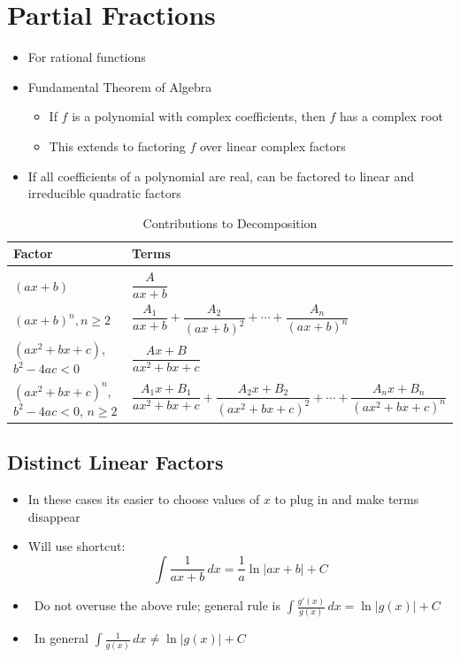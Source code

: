 \documentclass[letterpaper, 11pt, openany]{book}
\theoremstyle{mytheoremstyle}
\theoremstyle{myexamplestyle}
\begin{document}
\section{Partial Fractions}
\setcounter{figure}{0}
\begin{itemize}
    \item For rational functions
    \item Fundamental Theorem of Algebra
    \begin{itemize}
        \item If $f$ is a polynomial with complex coefficients, then $f$ has a complex root
        \item This extends to factoring $f$ over linear complex factors        
    \end{itemize}
    \item If all coefficients of a polynomial are real, can be factored to linear and irreducible quadratic factors
\end{itemize}
\begin{table}[htbp]
	\centering
	\caption{Contributions to Decomposition}
	\begin{tabular}{ll}
		\textbf{Factor} & \textbf{Terms} \\ \hline \\[-1em]
        $(ax + b)$ & $\dfrac{A}{ax + b}$ \\[2.5ex]
        $(ax + b)^{n}, n \geq 2$ & $\dfrac{A_{1}}{ax + b} + \dfrac{A_{2}}{(ax + b)^{2}} + \cdots + \dfrac{A_{n}}{(ax + b)^{n}}$\\[2.5ex]
        $(ax^{2} + bx + c)$, $b^{2} - 4ac < 0$ & $\dfrac{Ax + B}{ax^{2} + bx + c}$ \\[2.5ex]
		$(ax^{2} + bx + c)^{n}$, $b^{2} - 4ac < 0$, $n \geq 2$ & $\dfrac{A_{1}x + B_{1}}{ax^{2} + bx + c} + \dfrac{A_{2}x + B_{2}}{(ax^{2} + bx + c)^{2}} + \cdots + \dfrac{A_{n}x + B_{n}}{(ax^{2} + bx + c)^{n}}$ \\ \hline
	\end{tabular}
\end{table}

\subsection{Distinct Linear Factors}
\begin{itemize}
    \item In these cases its easier to choose values of $x$ to plug in and make terms disappear
    \item Will use shortcut:
    \[\int \frac{1}{ax + b} \, dx = \frac{1}{a} \ln |ax + b| + C  \]
    \item[{\faExclamationTriangle[solid]}] \ Do not overuse the above rule; general rule is $\int \frac{g'(x)}{g(x)}\, dx = \ln |g(x)| + C$
    \item[{\faExclamationTriangle[solid]}] \ In general $\int \frac{1}{g(x)}\, dx \neq \ln |g(x)| + C$    
\end{itemize}
\end{document}
